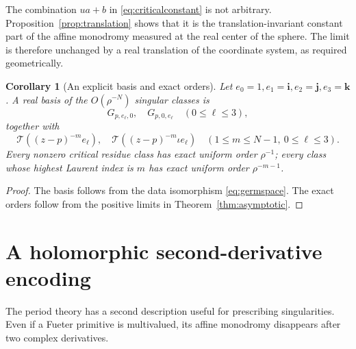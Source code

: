 \documentclass[11pt,a4paper]{article}
\numberwithin{equation}{section}
\newtheorem{corollary}[theorem]{Corollary}
\theoremstyle{definition}
\theoremstyle{remark}
\newcommand{\T}{\mathcal T}
\begin{document}
The combination $ua+b$ in \eqref{eq:criticalconstant} is not arbitrary.
Proposition~\ref{prop:translation} shows that it is the translation-invariant
constant part of the affine monodromy measured at the real center of the
sphere. The limit is therefore unchanged by a real translation of the
coordinate system, as required geometrically.

\begin{corollary}[An explicit basis and exact orders]
\label{cor:basis}
Let $e_0=1,e_1=\mathbf i,e_2=\mathbf j,e_3=\mathbf k$.
A real basis of the $O(\rho^{-N})$ singular classes is
\[
 G_{p,e_\ell,0},\quad G_{p,0,e_\ell}\quad(0\le\ell\le3),
\]
together with
\[
 \T((z-p)^{-m}e_\ell),\quad
 \T((z-p)^{-m}\iota e_\ell)
 \quad(1\le m\le N-1,\ 0\le\ell\le3).
\]
Every nonzero critical residue class has exact uniform order $\rho^{-1}$;
every class whose highest Laurent index is $m$ has exact uniform order
$\rho^{-m-1}$.
\end{corollary}
\begin{proof}
The basis follows from the data isomorphism \eqref{eq:germspace}.
The exact orders follow from the positive limits in
Theorem~\ref{thm:asymptotic}.
\end{proof}

\section{A holomorphic second-derivative encoding}
\label{sec:encoding}

The period theory has a second description useful for prescribing singularities.
Even if a Fueter primitive is multivalued, its affine monodromy disappears
after two complex derivatives.
\end{document}
